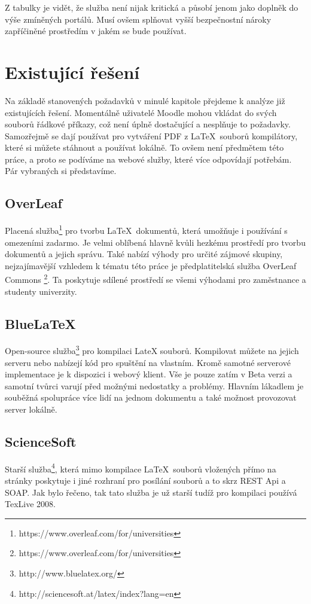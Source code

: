  Z tabulky je vidět, že služba není nijak kritická a působí jenom jako doplněk do výše zmíněných portálů. Musí ovšem splňovat vyšší bezpečnostní nároky zapříčiněné prostředím v jakém se bude používat. 

\section{Existující řešení}
Na základě stanovených požadavků v minulé kapitole přejdeme k analýze již existujících řešení. Momentálně uživatelé Moodle mohou vkládat do svých souborů řádkové příkazy, což není úplně dostačující a nesplňuje to požadavky. Samozřejmě se dají používat pro vytváření PDF z \LaTeX\ souborů kompilátory, které si můžete stáhnout a používat lokálně. To ovšem není předmětem této práce, a proto se podíváme na webové služby, které více odpovídají potřebám. Pár vybraných si představíme.  

\subsection{OverLeaf}
Placená služba\footnote{https://www.overleaf.com/for/universities} pro tvorbu \LaTeX\ dokumentů, která umožňuje i používání s omezeními zadarmo. Je velmi oblíbená hlavně kvůli hezkému prostředí pro tvorbu dokumentů a jejich správu. Také nabízí výhody pro určité zájmové skupiny, nejzajímavější vzhledem k tématu této práce je předplatitelská služba OverLeaf Commons \footnote{https://www.overleaf.com/for/universities}. Ta poskytuje sdílené prostředí se všemi výhodami pro zaměstnance a studenty univerzity.

\subsection{BlueLaTeX}
Open-source služba\footnote{http://www.bluelatex.org/} pro kompilaci LateX souborů. Kompilovat můžete na jejich serveru nebo nabízejí kód pro spuštění na vlastním. Kromě samotné serverové implementace je k dispozici i webový klient. Vše je pouze zatím v Beta verzi a samotní tvůrci varují před možnými nedostatky a problémy. Hlavním lákadlem je souběžná spolupráce více lidí na jednom dokumentu a také možnost provozovat server lokálně. 

\subsection{ScienceSoft}
Starší služba\footnote{http://sciencesoft.at/latex/index?lang=en}, která mimo kompilace \LaTeX\ souborů vložených přímo na stránky poskytuje i jiné rozhraní pro posílání souborů a to skrz REST Api a SOAP. Jak bylo řečeno, tak tato služba je už starší tudíž pro kompilaci používá TexLive 2008.

